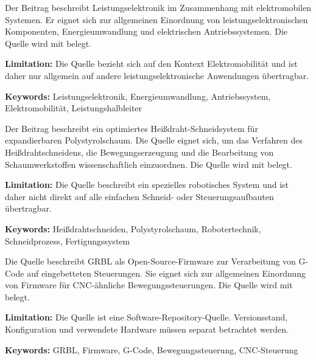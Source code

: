 
{ 
	Der Beitrag beschreibt Leistungselektronik im Zusammenhang mit elektromobilen Systemen. Er eignet sich zur allgemeinen Einordnung von leistungselektronischen Komponenten, Energieumwandlung und elektrischen Antriebssystemen. Die Quelle wird mit \cite{DeDoncker:2024} belegt.
	
	\bigskip
	
	\textbf{Limitation:} Die Quelle bezieht sich auf den Kontext Elektromobilität und ist daher nur allgemein auf andere leistungselektronische Anwendungen übertragbar.
	
	\scriptsize{\textbf{Keywords:} Leistungselektronik, Energieumwandlung, Antriebssystem, Elektromobilität, Leistungshalbleiter}
}



{ 
	Der Beitrag beschreibt ein optimiertes Heißdraht-Schneidsystem für expandierbaren Polystyrolschaum. Die Quelle eignet sich, um das Verfahren des Heißdrahtschneidens, die Bewegungserzeugung und die Bearbeitung von Schaumwerkstoffen wissenschaftlich einzuordnen. Die Quelle wird mit \cite{Gallina:2005} belegt.
	
	\bigskip
	
	\textbf{Limitation:} Die Quelle beschreibt ein spezielles robotisches System und ist daher nicht direkt auf alle einfachen Schneid- oder Steuerungsaufbauten übertragbar.
	
	\scriptsize{\textbf{Keywords:} Heißdrahtschneiden, Polystyrolschaum, Robotertechnik, Schneidprozess, Fertigungssystem}
}



{ 
	Die Quelle beschreibt GRBL als Open-Source-Firmware zur Verarbeitung von G-Code auf eingebetteten Steuerungen. Sie eignet sich zur allgemeinen Einordnung von Firmware für CNC-ähnliche Bewegungssteuerungen. Die Quelle wird mit \cite{grbl:github} belegt.
	
	\bigskip
	
	\textbf{Limitation:} Die Quelle ist eine Software-Repository-Quelle. Versionsstand, Konfiguration und verwendete Hardware müssen separat betrachtet werden.
	
	\scriptsize{\textbf{Keywords:} GRBL, Firmware, G-Code, Bewegungssteuerung, CNC-Steuerung}
}



